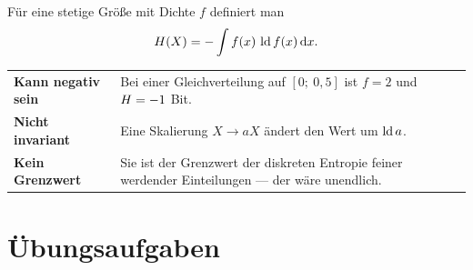 \begin{warnung}
Für eine stetige Größe mit Dichte $f$ definiert man
\[ H(X) = -\int f(x)\,\operatorname{ld} f(x)\,\mathrm{d} x . \]

\begin{center}
{\small
\renewcommand{\arraystretch}{1.5}
\begin{tabular}{@{}P{2.4cm}P{6.2cm}@{}}
\toprule
\textbf{Kann negativ sein} & Bei einer Gleichverteilung auf $[0;\ 0{,}5]$ ist $f=2$ und $H = -1$ Bit.\\
\textbf{Nicht invariant} & Eine Skalierung $X \to aX$ ändert den Wert um $\operatorname{ld} a$.\\
\textbf{Kein Grenzwert} & Sie ist  der Grenzwert der diskreten Entropie feiner werdender Einteilungen --- der wäre unendlich.\\
\bottomrule
\end{tabular}}
\end{center}

\begin{center}
\begin{minipage}{0.88\textwidth}
\end{minipage}
\end{center}
\end{warnung}

\section{Übungsaufgaben}


